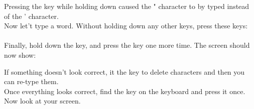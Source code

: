 
Pressing the  key while holding down
 caused the {\ttfamily "} character to
by typed instead of the {\ttfamily '} character.\\

Now let't type a word.  Without holding down any other keys, press these keys:\\

        \\

Finally, hold down the  key, and press
the  key one more time.  The screen
should now show:\\

{
	\raggedleft
}


If something doesn't look correct, it the
 key to delete characters and then
you can re-type them.\\

Once everything looks correct, find the  key on the keyboard
and press it once.  Now look at your screen.


